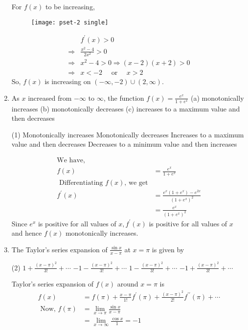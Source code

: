 \begin{enumerate}
\begin{answer}
		For $f(x)$ to be increasing,
		\begin{figure}[H]
			\texttt{[image: pset-2 single]}
		\end{figure}
		\begin{align*}
		& f^{\prime}(x)>0 \\
		\Rightarrow & \frac{x^{2}-4}{2 x^{2}}>0 \\
		\Rightarrow & x^{2}-4>0 \Rightarrow(x-2)(x+2)>0 \\
		\Rightarrow & x<-2 \quad \text { or } \quad x>2
		\end{align*}
		So, $f(x)$ is increasing on $(-\infty,-2) \cup(2, \infty)$.
	\end{answer}
	\item As $x$ increased from $-\infty$ to $\infty$, the function $f(x)=\frac{e^{x}}{1+e^{x}}$
	(a) monotonically increases
	(b) monotonically decreases
	(c) increases to a maximum value and then decreases
	\begin{tasks}(1)
		\task[\textbf{a.}]Monotonically increases 
		\task[\textbf{b.}]Monotonically decreases
		\task[\textbf{c.}]Increases to a maximum value and then decreases
		\task[\textbf{d.}]Decreases to a minimum value and then increases
	\end{tasks}
	\begin{answer}
		\begin{align*}
		\text{We have,}\\
		f(x)&=\frac{e^{x}}{1+e^{x}}\\
		\text{	Differentiating $f(x)$, we get}\\
		f^{\prime}(x)&=\frac{e^{x}\left(1+e^{x}\right)-e^{2 x}}{\left(1+e^{x}\right)^{2}}\\&=\frac{e^{x}}{\left(1+e^{x}\right)^{2}}
		\end{align*}
		Since $e^{x}$ is positive for all values of $x, f^{\prime}(x)$ is positive for all values of $x$ and hence $f(x)$ monotonically increases. 
		
		
	\end{answer}
	
	\item The Taylor's series expansion of $\frac{\sin x}{x-\pi}$ at $x=\pi$ is given by
	\begin{tasks}(2)
		\task[\textbf{a.}] $1+\frac{(x-\pi)^{2}}{3 !}+\cdots$ 
		\task[\textbf{b.}]$-1-\frac{(x-\pi)^{2}}{3 !}+\cdots$
		\task[\textbf{c.}]$1-\frac{(x-\pi)^{2}}{3 !}+\cdots$ 
		\task[\textbf{d.}]  $-1+\frac{(x-\pi)^{2}}{3 !}+\cdots$
	\end{tasks}
	\begin{answer}
		Taylor's series expansion of $f(x)$ around $x=\pi$ is
		\begin{align*}
		f(x)&=f(\pi)+\frac{x-\pi}{1 !} f^{\prime}(\pi)+\frac{(x-\pi)^{2}}{2 !} f^{\prime \prime}(\pi)+\cdots \\
		\text { Now, } f(\pi)&=\lim _{x \rightarrow \pi} \frac{\sin x}{x-\pi}\\&=\lim _{x \rightarrow \infty} \frac{\cos x}{1}=-1
		\end{align*}
		

\end{answer}
\end{enumerate}
